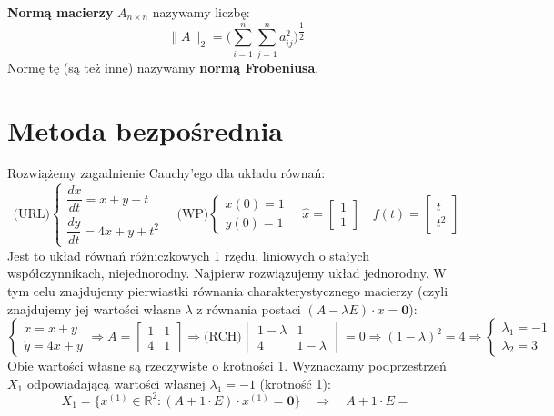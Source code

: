 \begin{df}
\textbf{Normą macierzy} $A_{n\times n}$ nazywamy liczbę: $$\| A\|_2=\Bigg(\sum_{i=1}^n\sum_{j=1}^na_{ij}^2\Bigg)^{\dfrac{1}{2}}$$ Normę tę (są też inne) nazywamy \textbf{normą Frobeniusa}.
\end{df}

\section{Metoda bezpośrednia}

\begin{przyk}
Rozwiążemy zagadnienie Cauchy'ego dla układu równań:
$$\textrm{(URL)}\left\{\begin{array}{l}
\dfrac{dx}{dt}=x+y+t\\
\dfrac{dy}{dt}=4x+y+t^2
\end{array}\right.\quad
\textrm{(WP)}\left\{\begin{array}{l}
x(0)=1\\
y(0)=1
\end{array}\right.\quad\hat{x}=
\begin{bmatrix}
1\\
1
\end{bmatrix}\quad f(t)=
\begin{bmatrix}
t\\
t^2
\end{bmatrix}$$
Jest to układ równań różniczkowych 1 rzędu, liniowych o stałych współczynnikach, niejednorodny. Najpierw rozwiązujemy układ jednorodny. W tym celu znajdujemy pierwiastki równania charakterystycznego macierzy (czyli znajdujemy jej wartości własne $\lambda$ z równania postaci $(A-\lambda E)\cdot x=\textbf{0}$):
$$\left\{\begin{array}{l}
\dot{x}=x+y\\
\dot{y}=4x+y
\end{array}\right.\Rightarrow A=
\begin{bmatrix}
1 & 1\\
4 & 1
\end{bmatrix}\Rightarrow \textrm{(RCH)}
\begin{vmatrix}
1-\lambda & 1\\
4 & 1-\lambda
\end{vmatrix}=0\Rightarrow (1-\lambda)^2=4\Rightarrow
\left\{\begin{array}{l}
\lambda_1=-1\\
\lambda_2=3
\end{array}\right.$$
Obie wartości własne są rzeczywiste o krotności 1. Wyznaczamy podprzestrzeń $X_1$ odpowiadającą wartości własnej $\lambda_1=-1$ (krotność 1): $$X_1=\big\{x^{(1)}\in\mathbb{R}^2:(A+1\cdot E)\cdot x^{(1)}=\textbf{0}\big\}\quad\Rightarrow\quad A+1\cdot E=
$$
\end{przyk}
